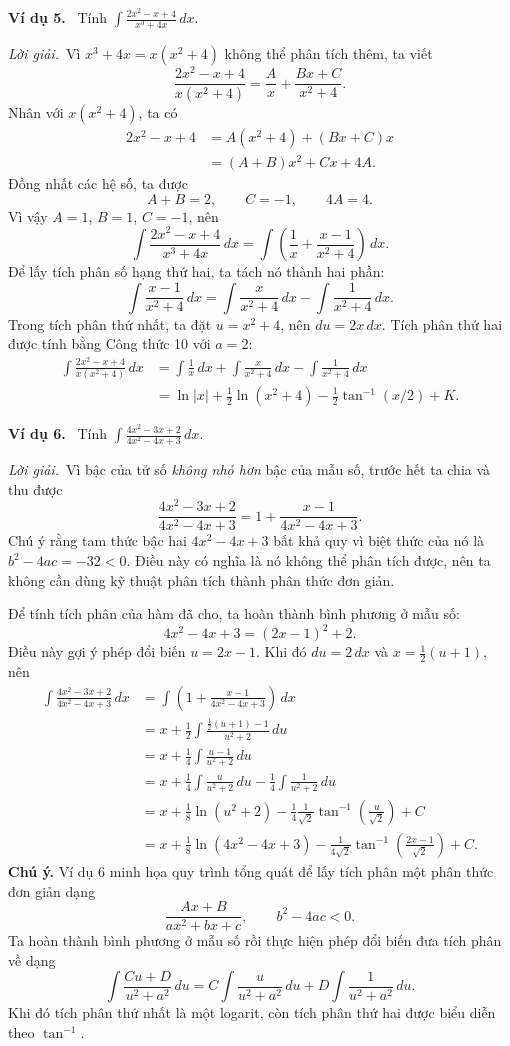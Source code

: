 \documentclass[12pt,a4paper]{article}
\newcommand{\ex}[1]{\par\medskip\noindent\textbf{Ví dụ #1.}\ }
\newcommand{\sol}{\par\nopagebreak[4]\noindent\textit{Lời giải.}\ }
\begin{document}
\ex{5} Tính $\displaystyle\int\frac{2x^2-x+4}{x^3+4x}\,dx$.
\sol Vì $x^3+4x=x(x^2+4)$ không thể phân tích thêm, ta viết
\[\frac{2x^2-x+4}{x(x^2+4)}=\frac Ax+\frac{Bx+C}{x^2+4}.\]
Nhân với $x(x^2+4)$, ta có
\begin{align*}
2x^2-x+4&=A(x^2+4)+(Bx+C)x\\
&=(A+B)x^2+Cx+4A.
\end{align*}
Đồng nhất các hệ số, ta được
\[A+B=2,\qquad C=-1,\qquad4A=4.\]
Vì vậy $A=1$, $B=1$, $C=-1$, nên
\[\int\frac{2x^2-x+4}{x^3+4x}\,dx=\int\left(\frac1x+\frac{x-1}{x^2+4}\right)\,dx.\]
Để lấy tích phân số hạng thứ hai, ta tách nó thành hai phần:
\[\int\frac{x-1}{x^2+4}\,dx=\int\frac{x}{x^2+4}\,dx-\int\frac1{x^2+4}\,dx.\]
Trong tích phân thứ nhất, ta đặt $u=x^2+4$, nên $du=2x\,dx$. Tích phân thứ hai được tính bằng Công thức 10 với $a=2$:
\begin{align*}
\int\frac{2x^2-x+4}{x(x^2+4)}\,dx
&=\int\frac1x\,dx+\int\frac{x}{x^2+4}\,dx-\int\frac1{x^2+4}\,dx\\
&=\ln|x|+\frac12\ln(x^2+4)-\frac12\tan^{-1}(x/2)+K.
\end{align*}

\ex{6} Tính $\displaystyle\int\frac{4x^2-3x+2}{4x^2-4x+3}\,dx$.
\sol Vì bậc của tử số \textit{không nhỏ hơn} bậc của mẫu số, trước hết ta chia và thu được
\[\frac{4x^2-3x+2}{4x^2-4x+3}=1+\frac{x-1}{4x^2-4x+3}.\]
Chú ý rằng tam thức bậc hai $4x^2-4x+3$ bất khả quy vì biệt thức của nó là $b^2-4ac=-32<0$. Điều này có nghĩa là nó không thể phân tích được, nên ta không cần dùng kỹ thuật phân tích thành phân thức đơn giản.

Để tính tích phân của hàm đã cho, ta hoàn thành bình phương ở mẫu số:
\[4x^2-4x+3=(2x-1)^2+2.\]
Điều này gợi ý phép đổi biến $u=2x-1$. Khi đó $du=2\,dx$ và $x=\frac12(u+1)$, nên
\begin{align*}
\int\frac{4x^2-3x+2}{4x^2-4x+3}\,dx
&=\int\left(1+\frac{x-1}{4x^2-4x+3}\right)\,dx\\
&=x+\frac12\int\frac{\frac12(u+1)-1}{u^2+2}\,du\\
&=x+\frac14\int\frac{u-1}{u^2+2}\,du\\
&=x+\frac14\int\frac{u}{u^2+2}\,du-\frac14\int\frac1{u^2+2}\,du\\
&=x+\frac18\ln(u^2+2)-\frac14\frac1{\sqrt2}\tan^{-1}\!\left(\frac u{\sqrt2}\right)+C\\
&=x+\frac18\ln(4x^2-4x+3)-\frac1{4\sqrt2}\tan^{-1}\!\left(\frac{2x-1}{\sqrt2}\right)+C.
\end{align*}
\textbf{Chú ý.} Ví dụ 6 minh họa quy trình tổng quát để lấy tích phân một phân thức đơn giản dạng
\[\frac{Ax+B}{ax^2+bx+c},\qquad b^2-4ac<0.\]
Ta hoàn thành bình phương ở mẫu số rồi thực hiện phép đổi biến đưa tích phân về dạng
\[\int\frac{Cu+D}{u^2+a^2}\,du=C\int\frac{u}{u^2+a^2}\,du+D\int\frac1{u^2+a^2}\,du.\]
Khi đó tích phân thứ nhất là một logarit, còn tích phân thứ hai được biểu diễn theo $\tan^{-1}$.
\end{document}
